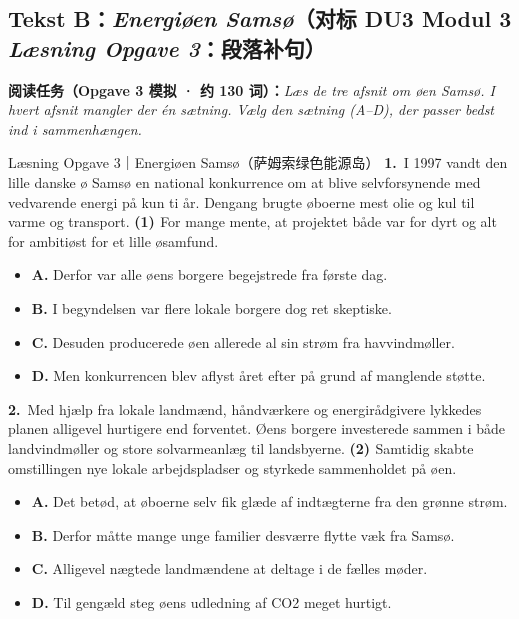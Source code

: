 \subsection*{Tekst B：\textit{Energiøen Samsø}（对标 DU3 Modul 3 \textit{Læsning Opgave 3}：段落补句）}

\textbf{阅读任务（Opgave 3 模拟 · 约 130 词）：}\textit{Læs de tre afsnit om øen Samsø. I hvert afsnit mangler der én sætning. Vælg den sætning (A--D), der passer bedst ind i sammenhængen.}

\begin{emailbox}{Læsning Opgave 3｜Energiøen Samsø（萨姆索绿色能源岛）}
\textbf{1.}\ I 1997 vandt den lille danske ø Samsø en national konkurrence om at blive selvforsynende med vedvarende energi på kun ti år. Dengang brugte øboerne mest olie og kul til varme og transport. \textbf{(1) \underline{\hspace{2.8cm}}} For mange mente, at projektet både var for dyrt og alt for ambitiøst for et lille øsamfund.
\begin{itemize}[label={}]
  \item \textbf{A.} Derfor var alle øens borgere begejstrede fra første dag.
  \item \textbf{B.} I begyndelsen var flere lokale borgere dog ret skeptiske.
  \item \textbf{C.} Desuden producerede øen allerede al sin strøm fra havvindmøller.
  \item \textbf{D.} Men konkurrencen blev aflyst året efter på grund af manglende støtte.
\end{itemize}

\textbf{2.}\ Med hjælp fra lokale landmænd, håndværkere og energirådgivere lykkedes planen alligevel hurtigere end forventet. Øens borgere investerede sammen i både landvindmøller og store solvarmeanlæg til landsbyerne. \textbf{(2) \underline{\hspace{2.8cm}}} Samtidig skabte omstillingen nye lokale arbejdspladser og styrkede sammenholdet på øen.
\begin{itemize}[label={}]
  \item \textbf{A.} Det betød, at øboerne selv fik glæde af indtægterne fra den grønne strøm.
  \item \textbf{B.} Derfor måtte mange unge familier desværre flytte væk fra Samsø.
  \item \textbf{C.} Alligevel nægtede landmændene at deltage i de fælles møder.
  \item \textbf{D.} Til gengæld steg øens udledning af CO2 meget hurtigt.
\end{itemize}


\end{emailbox}
